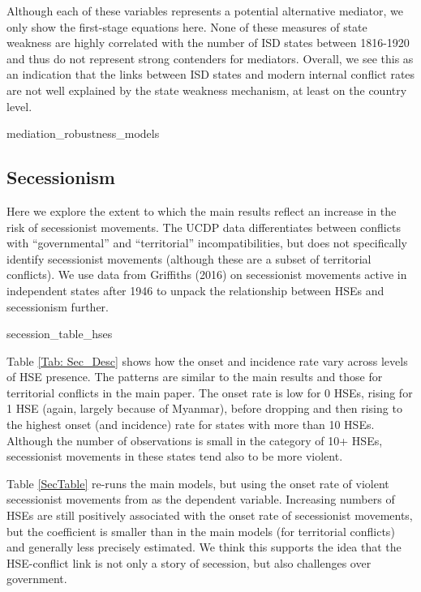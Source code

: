 Although each of these variables represents a potential alternative mediator, we
only show the first-stage equations here. None of these measures of state
weakness are highly correlated with the number of ISD states between 1816-1920
and thus do not represent strong contenders for mediators. Overall, we see this
as an indication that the links between ISD states and modern internal conflict
rates are not well explained by the state weakness mechanism, at least on the
country level. 

\clearpage     

{mediation_robustness_models}
    
\clearpage     

\subsection{Secessionism}

Here we explore the extent to which the main results reflect an increase in the
risk of secessionist movements. The UCDP data differentiates between conflicts
with ``governmental'' and ``territorial'' incompatibilities, but does not
specifically identify secessionist movements (although these are a subset of
territorial conflicts). We use data from Griffiths (2016) on secessionist
movements active in independent states after 1946 to unpack the relationship
between HSEs and secessionism further.  


{secession_table_hses}

Table \ref{Tab: Sec_Desc} shows how the onset and incidence rate vary across
levels of HSE presence. The patterns are similar to the main results and those
for territorial conflicts in the main paper. The onset rate is low for 0 HSEs,
rising for 1 HSE (again, largely because of Myanmar), before dropping and then
rising to the highest onset (and incidence) rate for states with more than 10
HSEs. Although the number of observations is small in the category of 10+ HSEs,
secessionist movements in these states tend also to be more violent. 

 
Table \ref{SecTable} re-runs the main models, but using the onset rate of
violent secessionist movements from \cite{Griffiths2016} as the dependent
variable. Increasing numbers of HSEs are still positively associated with the
onset rate of secessionist movements, but the coefficient is smaller than in the
main models (for territorial conflicts) and generally less precisely estimated.
We think this supports the idea that the HSE-conflict link is not only a story
of secession, but also challenges over government. 
    
